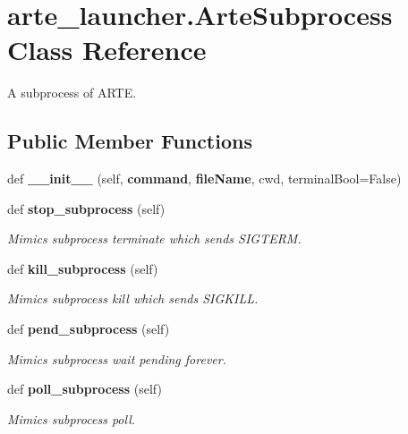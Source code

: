 \section{arte\+\_\+launcher.\+Arte\+Subprocess Class Reference}
\label{classarte__launcher_1_1_arte_subprocess}


A subprocess of A\+R\+TE.  


\subsection*{Public Member Functions}
\begin{DoxyCompactItemize}
\item 
def {\bfseries \+\_\+\+\_\+init\+\_\+\+\_\+} (self, {\bf command}, {\bf file\+Name}, cwd, terminal\+Bool=False)\label{classarte__launcher_1_1_arte_subprocess_a924f9ab8a4ede522aa7cc20b3fc8d9bb}

\item 
def {\bf stop\+\_\+subprocess} (self)
\begin{DoxyCompactList}\small\item\em Mimics subprocess terminate which sends S\+I\+G\+T\+E\+RM. \end{DoxyCompactList}\item 
def {\bf kill\+\_\+subprocess} (self)
\begin{DoxyCompactList}\small\item\em Mimics subprocess kill which sends S\+I\+G\+K\+I\+LL. \end{DoxyCompactList}\item 
def {\bf pend\+\_\+subprocess} (self)
\begin{DoxyCompactList}\small\item\em Mimics subprocess wait pending forever. \end{DoxyCompactList}\item 
def {\bf poll\+\_\+subprocess} (self)
\begin{DoxyCompactList}\small\item\em Mimics subprocess poll. \end{DoxyCompactList}\end{DoxyCompactItemize}

